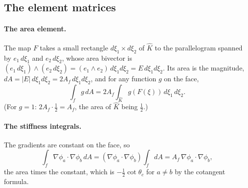 \subsection{The element matrices}

\paragraph{The area element.} The map $F$ takes a small rectangle $d\xi_1\times d\xi_2$ of $\hat K$ to the parallelogram spanned by $e_1\,d\xi_1$ and $e_2\,d\xi_2$, whose area bivector is $(e_1\,d\xi_1)\wedge(e_2\,d\xi_2) = (e_1\wedge e_2)\, d\xi_1 d\xi_2 = E\, d\xi_1 d\xi_2$. Its area is the magnitude, $dA = |E|\, d\xi_1 d\xi_2 = 2A_f\, d\xi_1d\xi_2$, and for any function $g$ on the face,
\begin{equation*}
\int_f g\, dA = 2A_f\int_{\hat K} g(F(\xi))\, d\xi_1\, d\xi_2 .
\end{equation*}
(For $g = 1$: $2A_f\cdot\frac12 = A_f$, the area of $\hat K$ being $\frac12$.)

\paragraph{The stiffness integrals.} The gradients are constant on the face, so
\begin{equation*}
\int_f \nabla\phi_a\cdot\nabla\phi_b\, dA = (\nabla\phi_a\cdot\nabla\phi_b)\int_f dA = A_f\,\nabla\phi_a\cdot\nabla\phi_b ,
\end{equation*}
the area times the constant, which is $-\frac12\cot\theta_c$ for $a \ne b$ by the cotangent formula.

